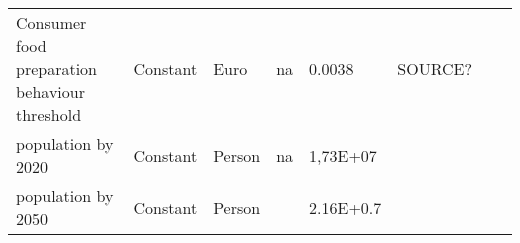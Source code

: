 \begin{landscape}
\begin{longtable}[c]{m{10em}lllm{15em}lll}
Consumer food preparation behaviour threshold & Constant & Euro                     & na                        & 0.0038                                                                                                                                                                                                                                                                                   & SOURCE?                                                                                                                                                                                      &                                                                                                                                                                                                                                       \\
population by 2020                            & Constant & Person                   & na                        & 1,73E+07                                                                                                                                                                                                                                                                                 &                                                                                                                                                                                              &                                                                                                                                                                                                                                       \\
population by 2050                            & Constant & Person                   &                           & 2.16E+0.7                                                                                                                                                                                                                                                                                &                                                                                                                                                                                              &                                                                                                                                                                                                                                       \\

\end{longtable}
\end{landscape}
